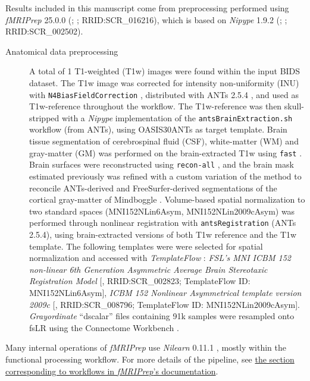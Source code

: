 \documentclass[
]{article}
\author{}
\date{}
\begin{document}
Results included in this manuscript come from preprocessing performed
using \emph{fMRIPrep} 25.0.0 (\citet{fmriprep1}; \citet{fmriprep2};
RRID:SCR\_016216), which is based on \emph{Nipype} 1.9.2
(\citet{nipype1}; \citet{nipype2}; RRID:SCR\_002502).

\begin{description}
\item[Anatomical data preprocessing]
A total of 1 T1-weighted (T1w) images were found within the input BIDS
dataset. The T1w image was corrected for intensity non-uniformity (INU)
with \texttt{N4BiasFieldCorrection} \citep{n4}, distributed with ANTs
2.5.4 \citep[RRID:SCR\_004757]{ants}, and used as T1w-reference
throughout the workflow. The T1w-reference was then skull-stripped with
a \emph{Nipype} implementation of the \texttt{antsBrainExtraction.sh}
workflow (from ANTs), using OASIS30ANTs as target template. Brain tissue
segmentation of cerebrospinal fluid (CSF), white-matter (WM) and
gray-matter (GM) was performed on the brain-extracted T1w using
\texttt{fast} \citep[FSL (version unknown),
RRID:SCR\_002823,][]{fsl_fast}. Brain surfaces were reconstructed using
\texttt{recon-all} \citep[FreeSurfer 7.3.2,
RRID:SCR\_001847,][]{fs_reconall}, and the brain mask estimated
previously was refined with a custom variation of the method to
reconcile ANTs-derived and FreeSurfer-derived segmentations of the
cortical gray-matter of Mindboggle
\citep[RRID:SCR\_002438,][]{mindboggle}. Volume-based spatial
normalization to two standard spaces (MNI152NLin6Asym,
MNI152NLin2009cAsym) was performed through nonlinear registration with
\texttt{antsRegistration} (ANTs 2.5.4), using brain-extracted versions
of both T1w reference and the T1w template. The following templates were
were selected for spatial normalization and accessed with
\emph{TemplateFlow} \citep[24.2.2,][]{templateflow}: \emph{FSL's MNI
ICBM 152 non-linear 6th Generation Asymmetric Average Brain Stereotaxic
Registration Model} {[}\citet{mni152nlin6asym}, RRID:SCR\_002823;
TemplateFlow ID: MNI152NLin6Asym{]}, \emph{ICBM 152 Nonlinear
Asymmetrical template version 2009c} {[}\citet{mni152nlin2009casym},
RRID:SCR\_008796; TemplateFlow ID: MNI152NLin2009cAsym{]}.
\emph{Grayordinate} ``dscalar'' files containing 91k samples were
resampled onto fsLR using the Connectome Workbench \citep{hcppipelines}.
\end{description}

Many internal operations of \emph{fMRIPrep} use \emph{Nilearn} 0.11.1
\citep[RRID:SCR\_001362]{nilearn}, mostly within the functional
processing workflow. For more details of the pipeline, see
\href{https://fmriprep.readthedocs.io/en/latest/workflows.html}{the
section corresponding to workflows in \emph{fMRIPrep}'s documentation}.
\end{document}
